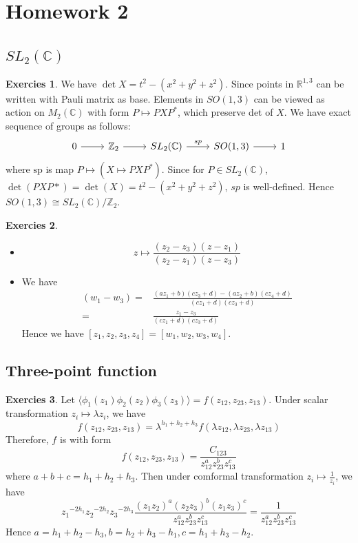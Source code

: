 \documentclass[11pt,a4paper]{article}
\theoremstyle{definition}
\newtheorem{exer}{Exercies}[subsection]
\begin{document}
\section{Homework 2}
\subsection{$SL_2(\mathbb{C})$}
\begin{exer}
	We have $\det X = t^2-(x^2+y^2+z^2)$. Since points in $\mathbb{R}^{1,3}$ can be written with Pauli matrix as base. Elements in $SO(1,3)$ can be viewed as action on $M_2(\mathbb{C})$ with form $P \mapsto PXP^*$, which preserve det of $X$.
	We have exact sequence of groups as follows:
	\[\begin{tikzcd}
		0 \ar[r] &\mathbb{Z}_2 \ar[r] &SL_2(\mathbb{C}) \ar[r,"sp"]&SO(1,3) \ar[r]&1 
	\end{tikzcd}\]
	where $\text{sp}$ is map $P \mapsto (X \mapsto PXP^*)$. Since for $P \in SL_2(\mathbb{C})$, $\det(PXP*) = \det(X) = t^2-(x^2+y^2+z^2)$, $sp$ is well-defined. Hence $SO(1,3) \cong SL_2(\mathbb{C})/\mathbb{Z}_2$.
\end{exer}
\begin{exer}
	\begin{itemize}
		\item \[
		z \mapsto \frac{(z_2 -z_3)(z-z_1)}{(z_2-z_1)(z-z_3)}
		\]
		\item We have
		\[
		\begin{aligned}
		(w_1 -w_3)=&\frac{(az_1+b)(cz_3+d)-(az_2 +b)(cz_4+d)}{(cz_1+d)(cz_3+d)}\\
		=&\frac{z_1-z_3}{(cz_1+d)(cz_3+d)}
		\end{aligned}
		\]
		Hence we have $[z_1,z_2,z_3,z_4]=[w_1,w_2,w_3,w_4]$.
	\end{itemize}
\end{exer}
\subsection{Three-point function}
\begin{exer}
	Let $\langle\phi_1(z_1)\phi_2(z_2)\phi_3(z_3)\rangle =f(z_{12},z_{23},z_{13})$. Under scalar transformation $z_i \mapsto \lambda z_i$, we have
	\[
	f(z_{12},z_{23},z_{13})=\lambda^{h_1+h_2+h_3}f(\lambda z_{12},\lambda z_{23},\lambda z_{13})
	\]
	Therefore, $f$ is with form
	\[
	f(z_{12},z_{23},z_{13})=\frac{C_{123}}{z_{12}^a z_{23}^b z_{13}^c}
	\]
	where $a+b+c = h_1 +h_2 +h_3$.
	Then under comformal transformation $z_i \mapsto \frac{1}{z_i}$, we have
	\[
	{z_1}^{-2h_1}{z_2}^{-2h_2}{z_3}^{-2h_3} \frac{(z_1z_2)^a(z_2 z_3)^b(z_1z_3)^c}{z_{12}^a z_{23}^b z_{13}^c}= \frac{1}{z_{12}^a z_{23}^b z_{13}^c}
	\]
	Hence $a= h_1 +h_2 -h_3, b=h_2 + h_3 -h_1, c= h_1 +h_3 - h_2$.
\end{exer}
\end{document}
